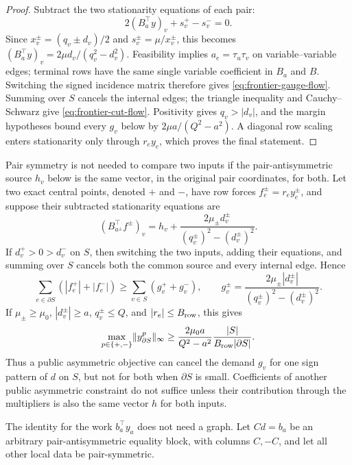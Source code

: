 \begin{proof}
Subtract the two stationarity equations of each pair:
\[
 2(B_a^\top y)_v+s_v^+-s_v^-=0.
\]
Since \(x_v^\pm=(q_v\pm d_v)/2\) and
\(s_v^\pm=\mu/x_v^\pm\), this becomes
\((B_a^\top y)_v=2\mu d_v/(q_v^2-d_v^2)\).  Feasibility implies
\(a_e=\tau_u\tau_v\) on variable--variable edges; terminal rows have the
same single variable coefficient in \(B_a\) and \(B\).  Switching the signed
incidence matrix therefore gives
\eqref{eq:frontier-gauge-flow}.  Summing over \(S\) cancels the internal
edges; the triangle inequality and Cauchy--Schwarz give
\eqref{eq:frontier-cut-flow}.  Positivity gives \(q_v>|d_v|\), and the
margin hypotheses bound every \(g_v\) below by
\(2\mu a/(Q^2-a^2)\).  A diagonal row scaling enters stationarity only
through \(r_ey_e\), which proves the final statement.
\end{proof}

Pair symmetry is not needed to compare two inputs if the pair-antisymmetric
source \(h_v\) below is the same vector, in the original pair coordinates,
for both.  Let two exact central points, denoted \(+\) and \(-\), have
row forces \(f_e^\pm=r_ey_e^\pm\), and suppose their subtracted stationarity
equations are
\[
 (B_{a^\pm}^\top f^\pm)_v
 =h_v+\frac{2\mu_\pm d_v^\pm}
              {(q_v^\pm)^2-(d_v^\pm)^2}.
\]
If \(d_v^+>0>d_v^-\) on \(S\), then switching the two inputs, adding their
equations, and summing over \(S\) cancels both the common source and every
internal edge.  Hence
\begin{equation}
 \sum_{e\in\partial S}(|f_e^+|+|f_e^-|)
 \geq\sum_{v\in S}(g_v^++g_v^-),
 \qquad
 g_v^\pm=\frac{2\mu_\pm|d_v^\pm|}
 {(q_v^\pm)^2-(d_v^\pm)^2}.
 \label{eq:frontier-two-input}
\end{equation}
If \(\mu_\pm\geq\mu_0\), \(|d_v^\pm|\geq a\), \(q_v^\pm\leq Q\), and
\(|r_e|\leq B_{\rm row}\), this gives
\begin{equation}
 \max_{p\in\{+,-\}}\lVert y_{\partial S}^p\rVert_\infty
 \geq\frac{2\mu_0a}{Q^2-a^2}
       \frac{|S|}{B_{\rm row}|\partial S|}.
 \label{eq:frontier-two-input-norm}
\end{equation}
Thus a public asymmetric objective can cancel the demand \(g_v\) for one
sign pattern of \(d\) on \(S\), but not for both when \(\partial S\) is
small.  Coefficients of another public asymmetric constraint do not suffice
unless their contribution through the multipliers is also the same vector
\(h\) for both inputs.

The identity for the work \(b_a^\top y_a\) does not need a graph.  Let
\(Cd=b_a\) be an arbitrary pair-antisymmetric equality block, with columns
\(C,-C\), and let all other local data be pair-symmetric.

